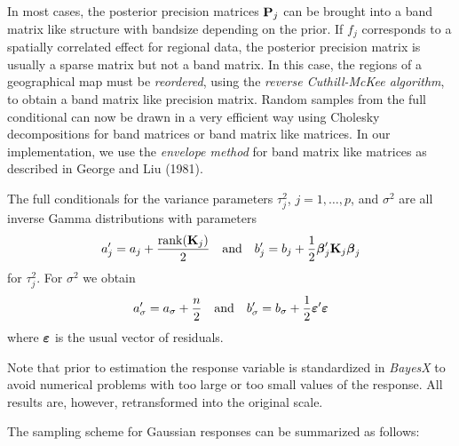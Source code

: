 \documentclass[11pt,a4paper,twoside]{bayesxarticle}
\begin{document}
In most cases, the posterior precision matrices $\mathbf{P}_j$ can be brought
into a band matrix like structure with bandsize depending on the
prior. If $f_j$ corresponds to a spatially correlated effect for
regional data, the posterior precision matrix is usually a sparse
matrix but not a band matrix. In this case, the regions of a
geographical map must be {\em reordered}, using the {\em reverse
Cuthill-McKee algorithm}, to obtain a band matrix like precision
matrix. Random samples from the full conditional can now be drawn in
a very efficient way using Cholesky decompositions for band matrices
or band matrix like matrices. In our implementation, we use the {\em
envelope method} for band matrix like matrices as described in
George and Liu (1981).

The full conditionals for the variance parameters $\tau^2_j$,
$j=1,\dots,p$, and $\sigma^2$ are all inverse Gamma distributions
with parameters
\begin{equation}
\label{hypab} a_j' = a_j + \frac{\mathrm{rank}(\Kvec_j)}{2} \quad
\mbox{and} \quad b_j' = b_j + \frac{1}{2} \betavec_j'\Kvec_j \betavec_j
\end{equation}
for $\tau^2_j$. For $\sigma^2$ we obtain
\begin{equation}
\label{hypabsigma} a_{\sigma}' = a_{\sigma}+\frac{n}{2} \quad
\mbox{and} \quad b_{\sigma}' = b_{\sigma} + \frac{1}{2}
\varepsilonvec'\varepsilonvec
\end{equation}
where $\boldsymbol{\varepsilon}$ is the usual vector of residuals.

Note that prior to estimation the response variable is standardized
in {\em BayesX} to avoid numerical problems with too large or too
small values of the response. All results are, however,
retransformed into the original scale.

The sampling scheme for Gaussian responses can be summarized as
follows:
\end{document}
